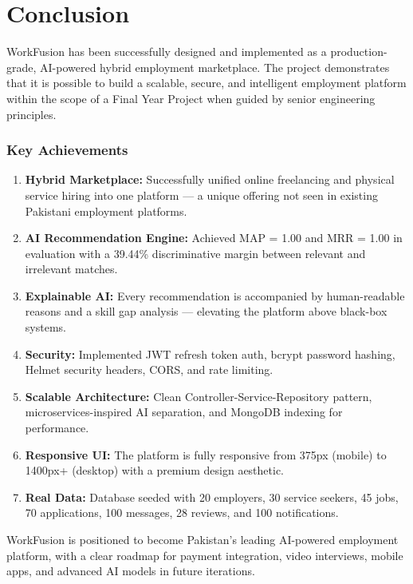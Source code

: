 \documentclass[12pt,a4paper,oneside]{report}
\begin{document}
\chapter{Conclusion}

WorkFusion has been successfully designed and implemented as a production-grade, AI-powered hybrid employment marketplace. The project demonstrates that it is possible to build a scalable, secure, and intelligent employment platform within the scope of a Final Year Project when guided by senior engineering principles.

\subsection*{Key Achievements}

\begin{enumerate}[noitemsep]
  \item \textbf{Hybrid Marketplace:} Successfully unified online freelancing and physical service hiring into one platform — a unique offering not seen in existing Pakistani employment platforms.
  \item \textbf{AI Recommendation Engine:} Achieved MAP = 1.00 and MRR = 1.00 in evaluation with a 39.44\% discriminative margin between relevant and irrelevant matches.
  \item \textbf{Explainable AI:} Every recommendation is accompanied by human-readable reasons and a skill gap analysis — elevating the platform above black-box systems.
  \item \textbf{Security:} Implemented JWT refresh token auth, bcrypt password hashing, Helmet security headers, CORS, and rate limiting.
  \item \textbf{Scalable Architecture:} Clean Controller-Service-Repository pattern, microservices-inspired AI separation, and MongoDB indexing for performance.
  \item \textbf{Responsive UI:} The platform is fully responsive from 375px (mobile) to 1400px+ (desktop) with a premium design aesthetic.
  \item \textbf{Real Data:} Database seeded with 20 employers, 30 service seekers, 45 jobs, 70 applications, 100 messages, 28 reviews, and 100 notifications.
\end{enumerate}

WorkFusion is positioned to become Pakistan's leading AI-powered employment platform, with a clear roadmap for payment integration, video interviews, mobile apps, and advanced AI models in future iterations.
\end{document}
